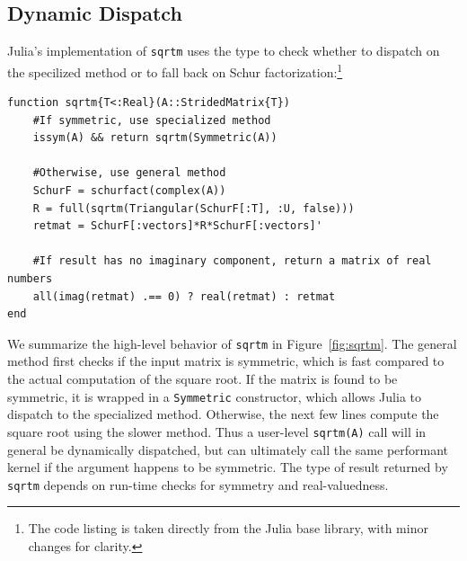 

\subsection{Dynamic Dispatch}
Julia's implementation of \lstinline|sqrtm| uses the type to check whether to dispatch on the specilized method or to fall back on Schur factorization:\footnote{
The code listing is taken directly from the Julia base library, with minor
changes for clarity.}
%
\begin{lstlisting}
function sqrtm{T<:Real}(A::StridedMatrix{T})
	#If symmetric, use specialized method
	issym(A) && return sqrtm(Symmetric(A))

	#Otherwise, use general method
	SchurF = schurfact(complex(A))
	R = full(sqrtm(Triangular(SchurF[:T], :U, false)))
	retmat = SchurF[:vectors]*R*SchurF[:vectors]'

	#If result has no imaginary component, return a matrix of real numbers
	all(imag(retmat) .== 0) ? real(retmat) : retmat
end
\end{lstlisting}
We summarize the high-level behavior of \lstinline|sqrtm| in Figure~\ref{fig:sqrtm}.
The general method first checks if the input matrix is symmetric, which is fast
compared to the actual computation of the square root. If the matrix is found to
be symmetric, it is wrapped in a \lstinline|Symmetric| constructor, which allows
Julia to dispatch to the specialized method. Otherwise, the next few lines
compute the square root using the slower method.
Thus a user-level \lstinline|sqrtm(A)| call will in
general be dynamically dispatched, but can ultimately call the same
performant kernel if the argument happens to be symmetric.
The type of result returned by \lstinline|sqrtm| depends
on run-time checks for symmetry and real-valuedness.

